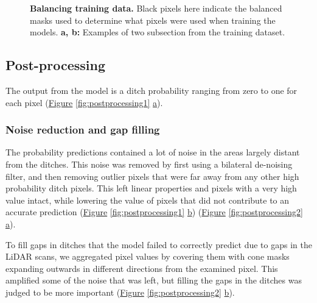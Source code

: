 \documentclass[11pt, review]{elsarticle} %
\begin{document}
\begin{figure} [!htb]
    \caption{\textbf{Balancing training data.} Black pixels here indicate the balanced masks used to determine what pixels were used when training the models. \textbf{a, b: }Examples of two subsection from the training dataset.}
    \label{fig:balancedmasks}
\end{figure}

\newpage
\subsection{Post-processing}

The output from the model is a ditch probability ranging from zero to one for each pixel (\hyperref[fig:postprocessing1]{Figure} \ref{fig:postprocessing1} \hyperref[fig:postprocessing1]{a}).

\subsubsection{Noise reduction and gap filling}

The probability predictions contained a lot of noise in the areas largely distant from the ditches. This noise was removed by first using a bilateral de-noising filter, and then removing outlier pixels that were far away from any other high probability ditch pixels. This left linear properties and pixels with a very high value intact, while lowering the value of pixels that did not contribute to an accurate prediction (\hyperref[fig:postprocessing1]{Figure} \ref{fig:postprocessing1} \hyperref[fig:postprocessing1]{b}) (\hyperref[fig:postprocessing2]{Figure} \ref{fig:postprocessing2} \hyperref[fig:postprocessing2]{a}).

To fill gaps in ditches that the model failed to correctly predict due to gaps in the LiDAR scans, we aggregated pixel values by covering them with cone masks expanding outwards in different directions from the examined pixel. This amplified some of the noise that was left, but filling the gaps in the ditches was judged to be more important (\hyperref[fig:postprocessing2]{Figure} \ref{fig:postprocessing2} \hyperref[fig:postprocessing2]{b}).
\end{document}
